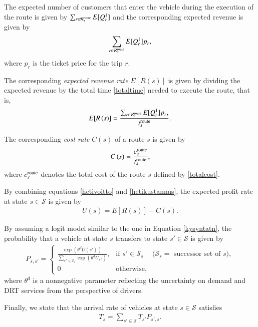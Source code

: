 \documentclass[dissertation,draft*]{aaltoseries}
\begin{document}
The expected number of customers that enter the vehicle
during the execution of the route is given by $\sum_{r \in \mathcal{R}_{s}^{\rm route}} E[Q_{r}^1]$
and the corresponding expected revenue is given by 
\begin{align*}
\sum_{r \in \mathcal{R}_{s}^{\rm route}} E[Q_{r}^1] p_r,
\end{align*}
where $p_r$ is the ticket price for the trip $r$.

The corresponding \emph{expected revenue rate} $E[R\left(s \right)]$ is given by dividing the 
expected revenue by the total time \eqref{totaltime} needed to execute the route, that is,
\begin{align}
\label{hetivoitto}
E[R\left( s \right)] 
= \frac{\sum_{r \in \mathcal{R}_{s}^{\rm route}} E[Q_{r}^1] p_r,}{t_{s}^{\rm route}}.
\end{align}

The corresponding \emph{cost rate} $C(s)$ 
of a route $s$ is given by
\begin{align}
\label{hetikustannus}
C\left(s\right) = \frac{c_{s}^{\rm route}}{t_{s}^{\rm route}},
\end{align}
where $c_{s}^{\rm route}$ denotes the total cost of the route $s$ defined by \eqref{totalcost}.

By combining equations \eqref{hetivoitto} and \eqref{hetikustannus}, 
the expected profit rate at state $s \in \mathcal{S}$
is given by
\begin{align}
\label{profitrate}
U\left(s\right) = E[R(s)] - C(s).
\end{align}

By assuming a logit model similar to the one in Equation \eqref{kysyntatn},
the probability that a vehicle at state $s$ transfers to state $s' \in \mathcal{S}$
is given by
\begin{align}
\label{transitionprobability}
P_{s,s'} = 
\left\{
\begin{array}{llr}
\frac{\exp(\theta^d U(s'))}{\sum_{s'' \in \mathcal{S}_{s}} \exp(\theta^d U_{s''})}, 
& \mbox{if } s' \in \mathcal{S}_s & (\mathcal{S}_s = \mbox{ successor set of $s$)}, \\
0 & \mbox{otherwise},&
\end{array}
\right.
\end{align}
where $\theta^d$ is a 
nonnegative parameter reflecting the uncertainty on
demand and DRT services from the perspective of drivers.

Finally, we state that the arrival rate of vehicles 
at state $s \in \mathcal{S}$ satisfies
\begin{align}
\label{saapumisnopeus}
T_s = \sum_{s' \in \mathcal{S}} T_{s'} P_{s',s}.
\end{align}
\end{document}
